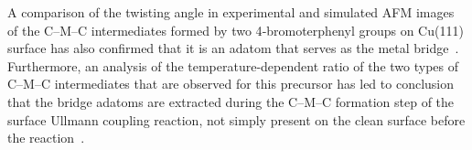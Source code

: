 \documentclass[%
 reprint,
 amsmath,amssymb,
 aps,
prb,
floatfix,
]{revtex4-2}
\newcommand{\comm}{\color{Purple}} %
\begin{document}
{%

A comparison of the twisting angle in experimental and simulated AFM images of the C--M--C intermediates formed by two 4‐bromoterphenyl groups on Cu(111) surface 
has also confirmed that it is an adatom that serves as the metal bridge~\cite{acsnano2019}. Furthermore, an analysis of the temperature-dependent ratio of the two types of C--M--C intermediates that are observed for this precursor has led to conclusion that the bridge adatoms are extracted during the C--M--C formation step of the surface Ullmann coupling reaction, not simply present on the clean surface before the reaction~\cite{acsnano2019}. 

}

\end{document}
